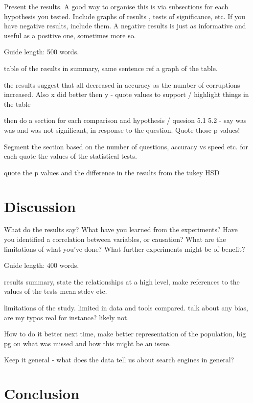 \documentclass{csfourzero}
\begin{document}
Present the results. A good way to organise this is via subsections
for each hypothesis you tested. Include graphs of results
, tests of significance, etc. If you have
negative results, include them. A negative results is just as
informative and useful as a positive one, sometimes more so.

Guide length: 500 words.

table of the results in summary, same sentence ref a graph of the table.

the results suggest that all decreased in accuracy as the number of corruptions increased. Also x did better then y - quote values to support / highlight things in the table

then do a section for each comparison and hypothesis / quesion 5.1 5.2 - say was was and was not significant, in response to the question. Quote those p values!

Segment the section based on the number of questions, accuracy vs speed etc. for each quote the values of the statistical tests.

quote the p values and the difference in the results from the tukey HSD

\section{Discussion}
\label{sec:discuss}

What do the results say? What have you learned from the
experiments? Have you identified a correlation between variables, or
causation? What are the limitations of what you've done? What further
experiments might be of benefit?

Guide length: 400 words.

results summary, state the relationships at a high level, make references to the values of the tests mean stdev etc.

limitations of the study. limited in data and tools compared. talk about any bias, are my typos real for instance? likely not.

How to do it better next time, make better representation of the population, big pg on what was missed and how this might be an issue.

Keep it general - what does the data tell us about search engines in general?

\section{Conclusion}
\label{sec:conc}
\end{document}
